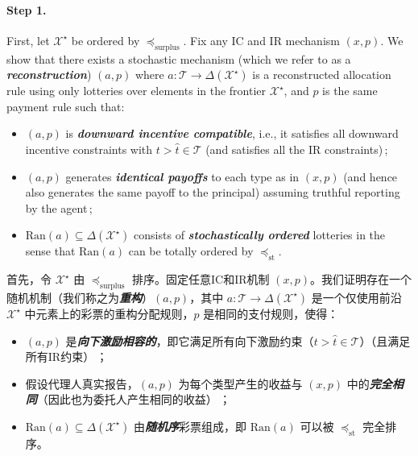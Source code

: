 \documentclass[12pt,letterpaper]{article}
\newenvironment{original}{\color{black}\noindent}{}
\newenvironment{translation}{\color{blue}\noindent}{}
\theoremstyle{plain}
\theoremstyle{definition}
\theoremstyle{remark}
\renewcommand{\1}{\mathds{1}}
\newcommand{\X}{\mathcal{X}}
\theoremstyle{definition}
\begin{document}
\paragraph{\textbf{Step 1.}}\hspace{-2mm}\begin{original}First, let $\X^\star$ be ordered by $\preceq_\text{surplus}$.  Fix any IC and IR mechanism $(x, p)$. We show that there exists a stochastic mechanism (which we refer to as a \textit{\textbf{reconstruction}}) $(a, p)$ where $a:\mathcal{T} \rightarrow \Delta(\X^\star)$ is a reconstructed allocation rule using only lotteries over elements in the frontier $\X^\star$, and $p$ is the same payment rule such that:
\begin{itemize}
    \item $(a, p)$ is \textit{\textbf{downward incentive compatible}}, i.e., it satisfies all downward incentive constraints with $t > \hat{t} \in \mathcal{T}$ (and satisfies all the IR constraints)\,;
    \item $(a, p)$ generates \textit{\textbf{identical payoffs}} to each type as in $(x, p)$ (and hence also generates the same payoff to the principal) assuming truthful reporting by the agent\,;
    \item $\text{Ran}(a) \subseteq \Delta(\mathcal{X}^\star)$ consists of \textit{\textbf{stochastically ordered}} lotteries in the sense that $\text{Ran}(a)$ can be totally ordered by $\preceq_{\text{st}}$.
\end{itemize}
\end{original}
\begin{translation}
首先，令 $\X^\star$ 由 $\preceq_\text{surplus}$ 排序。固定任意IC和IR机制 $(x, p)$。我们证明存在一个随机机制（我们称之为\textit{\textbf{重构}}）$(a, p)$，其中 $a:\mathcal{T} \rightarrow \Delta(\X^\star)$ 是一个仅使用前沿 $\X^\star$ 中元素上的彩票的重构分配规则，$p$ 是相同的支付规则，使得：
\begin{itemize}
    \item $(a, p)$ 是\textit{\textbf{向下激励相容的}}，即它满足所有向下激励约束（$t > \hat{t} \in \mathcal{T}$）（且满足所有IR约束）\,；
    \item 假设代理人真实报告，$(a, p)$ 为每个类型产生的收益与 $(x, p)$ 中的\textit{\textbf{完全相同}}（因此也为委托人产生相同的收益）\,；
    \item $\text{Ran}(a) \subseteq \Delta(\mathcal{X}^\star)$ 由\textit{\textbf{随机序}}彩票组成，即 $\text{Ran}(a)$ 可以被 $\preceq_{\text{st}}$ 完全排序。
\end{itemize}
\end{translation}
\end{document}
